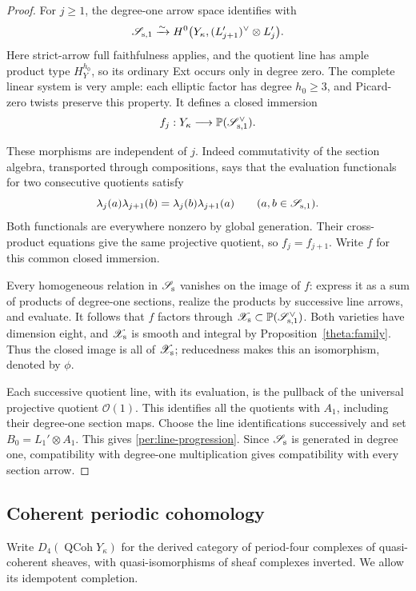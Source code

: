 \documentclass[11pt]{article}
\theoremstyle{definition}
\theoremstyle{remark}
\newcommand{\cO}{\mathcal O}
\numberwithin{equation}{section}
\begin{document}
\begin{proof}
For $j\ge1$, the degree-one arrow space identifies with
\[
 \mathscr S_{{\rm s},1}
    \xrightarrow{\sim}
 H^0\bigl(Y_\kappa,(L_{j+1}')^\vee\otimes L_j'\bigr).
\]
Here strict-arrow full faithfulness applies, and the quotient line
has ample product type $H_Y^{h_0}$, so its ordinary Ext occurs only
in degree zero.  The complete linear system is very ample: each
elliptic factor has degree $h_0\ge3$, and Picard-zero twists preserve
this property.  It defines a closed immersion
\[
 f_j:Y_\kappa\longrightarrow
        \mathbb P(\mathscr S_{{\rm s},1}^{\vee}).
\]

These morphisms are independent of $j$.  Indeed commutativity of
the section algebra, transported through compositions, says that
the evaluation functionals for two consecutive quotients satisfy
\[
 \lambda_j(a)\lambda_{j+1}(b)
       =\lambda_j(b)\lambda_{j+1}(a)
       \qquad(a,b\in\mathscr S_{{\rm s},1}).
\]
Both functionals are everywhere nonzero by global generation.
Their cross-product equations give the same projective quotient,
so $f_j=f_{j+1}$.  Write $f$ for this common closed immersion.

Every homogeneous relation in $\mathscr S_{\rm s}$ vanishes on
the image of $f$: express it as a sum of products of degree-one
sections, realize the products by successive line arrows, and
evaluate.  It follows that $f$ factors through
$\mathscr X_{\rm s}\subset
\mathbb P(\mathscr S_{{\rm s},1}^{\vee})$.  Both varieties have
dimension eight, and $\mathscr X_{\rm s}$ is smooth and integral
by Proposition~\ref{theta:family}.  Thus the closed image is all of
$\mathscr X_{\rm s}$; reducedness makes this an isomorphism, denoted
by $\phi$.

Each successive quotient line, with its evaluation, is the pullback
of the universal projective quotient $\cO(1)$.  This identifies all
the quotients with $A_1$, including their degree-one section maps.
Choose the line identifications successively and set
$B_0=L_1'\otimes A_1$.  This gives
\eqref{per:line-progression}.  Since $\mathscr S_{\rm s}$ is generated
in degree one, compatibility with degree-one multiplication gives
compatibility with every section arrow.
\end{proof}

\subsection{Coherent periodic cohomology}

Write $D_4(\operatorname{QCoh}Y_\kappa)$ for the derived category of
period-four complexes of quasi-coherent sheaves, with
quasi-isomorphisms of sheaf complexes inverted.  We allow its idempotent
completion.
\end{document}
